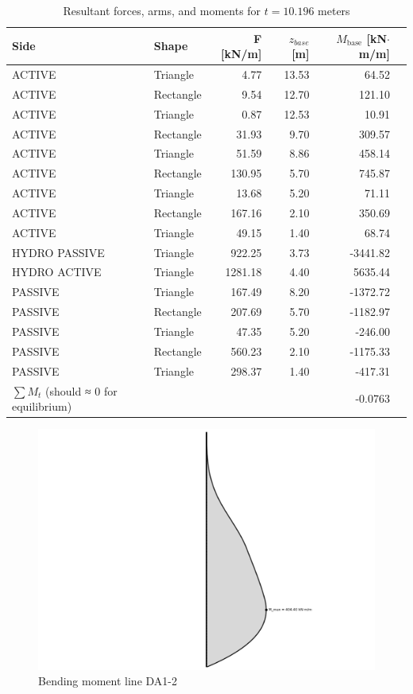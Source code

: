 \begin{table}[H]
  \centering
  \caption{Resultant forces, arms, and moments for $t = 10.196$ meters}
  \label{tab:appendix_forces_arms_moments_new}
  \small
  \setlength{\tabcolsep}{6pt}
  \renewcommand{\arraystretch}{1.15}
  \begin{tabular}{@{}l l r r r r@{}}
    \toprule
    Side & Shape &
    F [kN/m] & $z_{base}$ [m] &
    $M_{\text{base}}$ [kN$\cdot$m/m] \\
    \midrule
    ACTIVE & Triangle  &   4.77  & 13.53 &   64.52 \\
    ACTIVE & Rectangle &   9.54  & 12.70 &  121.10 \\
    ACTIVE & Triangle  &   0.87  & 12.53 &   10.91 \\
    ACTIVE & Rectangle &  31.93  &  9.70 &  309.57 \\
    ACTIVE & Triangle  &  51.59  &  8.86 &  458.14 \\
    ACTIVE & Rectangle & 130.95  &  5.70 &  745.87 \\
    ACTIVE & Triangle  &  13.68  &  5.20 &   71.11 \\
    ACTIVE & Rectangle & 167.16  &  2.10 &  350.69 \\
    ACTIVE & Triangle  &  49.15  &  1.40 &   68.74 \\
    HYDRO PASSIVE & Triangle  & 922.25 &  3.73 & -3441.82 \\
    HYDRO ACTIVE & Triangle  & 1281.18 & 4.40 & 5635.44 \\
    PASSIVE & Triangle  & 167.49  &  8.20 & -1372.72 \\
    PASSIVE & Rectangle & 207.69  &  5.70 & -1182.97 \\
    PASSIVE & Triangle  &  47.35  &  5.20 &  -246.00 \\
    PASSIVE & Rectangle & 560.23  &  2.10 & -1175.33 \\
    PASSIVE & Triangle  & 298.37  &  1.40 &  -417.31 \\
    \midrule
    $\sum M_{t}$ (should ≈ 0 for equilibrium) & & & & -0.0763 \\
    \bottomrule
  \end{tabular}
\end{table}

\begin{figure}[H]
    \centering
    \includegraphics[width=0.80\linewidth]{figures/appendix-i/bending_moments_line_DA1_2.png}
    \caption{Bending moment line DA1-2}
    \label{fig:appendix_bending_moments_DA1_2}
\end{figure}

